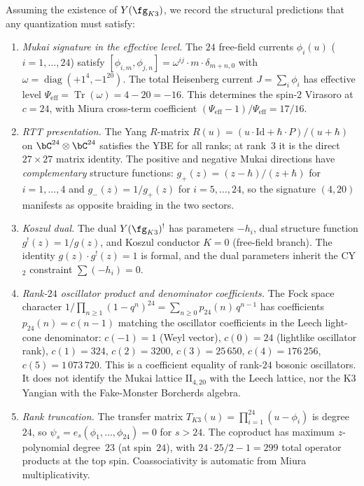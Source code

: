 \begin{remark}
\label{rem:k3-yangian-quantization}
\label{sec:k3-yangian-quantization}
Assuming the existence of $Y(\fg_{K3})$, we record the structural
predictions that any quantization must satisfy:
\begin{enumerate}
\item \emph{Mukai signature in the effective level.}
The $24$ free-field currents $\phi_i(u)$ ($i = 1, \ldots, 24$)
satisfy $[\phi_{i,m}, \phi_{j,n}] = \omega^{ij} \cdot m \cdot
\delta_{m+n,0}$ with $\omega = \operatorname{diag}(+1^4, -1^{20})$.
The total Heisenberg current $J = \sum_i \phi_i$ has effective level
$\Psi_{\mathrm{eff}} = \operatorname{Tr}(\omega) = 4 - 20 = -16$.
This determines the spin-$2$ Virasoro at $c = 24$, with Miura
cross-term coefficient $(\Psi_{\mathrm{eff}} - 1)/\Psi_{\mathrm{eff}} = 17/16$.

\item \emph{RTT presentation.}
The Yang $R$-matrix
$R(u) = (u \cdot \mathrm{Id} + \hbar \cdot P)/(u + \hbar)$
on $\bC^{24} \otimes \bC^{24}$ satisfies the YBE for all ranks; at
rank~$3$ it is the direct $27 \times 27$ matrix identity.
The positive and negative Mukai directions have \emph{complementary}
structure functions:
$g_+(z) = (z - \hbar)/(z + \hbar)$ for $i = 1, \ldots, 4$ and
$g_-(z) = 1/g_+(z)$ for $i = 5, \ldots, 24$, so the signature
$(4, 20)$ manifests as opposite braiding in the two sectors.

\item \emph{Koszul dual.}
The dual $Y(\fg_{K3})^!$ has parameters $-h_i$, dual structure
function $g^!(z) = 1/g(z)$, and Koszul conductor $K = 0$
(free-field branch).
The identity $g(z) \cdot g^!(z) = 1$ is formal, and the dual parameters inherit the CY$_2$ constraint
$\sum(-h_i) = 0$.

\item \emph{Rank-$24$ oscillator product and denominator coefficients.}
The Fock space character
$1/\prod_{n \geq 1}(1-q^n)^{24} = \sum_{n \geq 0} p_{24}(n)\, q^{n-1}$
has coefficients $p_{24}(n) = c(n-1)$ matching the oscillator
coefficients in the Leech light-cone denominator:
$c(-1) = 1$ (Weyl vector),
$c(0) = 24$ (lightlike oscillator rank),
$c(1) = 324$, $c(2) = 3200$, $c(3) = 25\,650$, $c(4) = 176\,256$,
$c(5) = 1\,073\,720$.
This is a coefficient equality of rank-$24$ bosonic oscillators.
It does not identify the Mukai lattice \(\mathrm{II}_{4,20}\) with
the Leech lattice, nor the K3 Yangian with the Fake-Monster
Borcherds algebra.

\item \emph{Rank truncation.}
The transfer matrix $T_{K3}(u) = \prod_{i=1}^{24}(u - \phi_i)$ is
degree~$24$, so $\psi_s = e_s(\phi_1, \ldots, \phi_{24}) = 0$ for
$s > 24$.
The coproduct has maximum $z$-polynomial degree~$23$ (at spin~$24$),
with $24 \cdot 25/2 - 1 = 299$ total operator products at the top spin.
Coassociativity is automatic from Miura multiplicativity.
\end{enumerate}
\end{remark}

